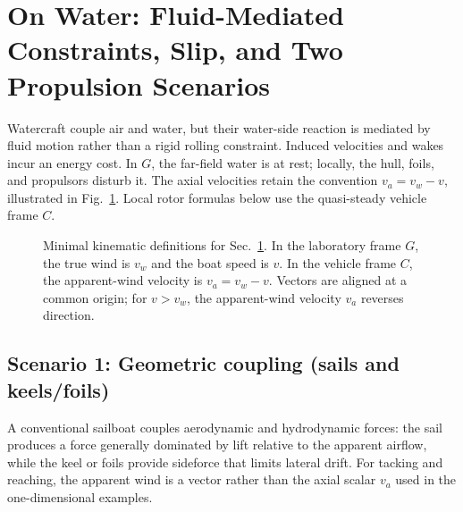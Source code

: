 \documentclass[reprint,aps,pra,longbibliography]{revtex4-2}
\begin{document}
\section{On Water: Fluid-Mediated Constraints, Slip, and Two Propulsion Scenarios}
\label{sec:water-sail-prop}


Watercraft couple air and water, but their water-side reaction is mediated by fluid motion rather than a rigid rolling constraint. Induced velocities and wakes incur an energy cost. In \(G\), the far-field water is at rest; locally, the hull, foils, and propulsors disturb it. The axial velocities retain the convention \(v_a=v_w-v\), illustrated in Fig.~\ref{fig:water-frame}. Local rotor formulas below use the quasi-steady vehicle frame \(C\).


\begin{figure}[tb]
\centering
{}
\caption{Minimal kinematic definitions for Sec.~\ref{sec:water-sail-prop}. In the laboratory frame \(G\), the true wind is \(v_w\) and the boat speed is \(v\). In the vehicle frame \(C\), the apparent-wind velocity is \(v_a = v_w - v\). Vectors are aligned at a common origin; for \(v > v_w\), the apparent-wind velocity \(v_a\) reverses direction.}
\label{fig:water-frame}
\end{figure}

\subsection{Scenario 1: Geometric coupling (sails and keels/foils)}


A conventional sailboat couples aerodynamic and hydrodynamic forces: the sail produces a force generally dominated by lift relative to the apparent airflow, while the keel or foils provide sideforce that limits lateral drift. For tacking and reaching, the apparent wind is a vector rather than the axial scalar \(v_a\) used in the one-dimensional examples.
\end{document}
